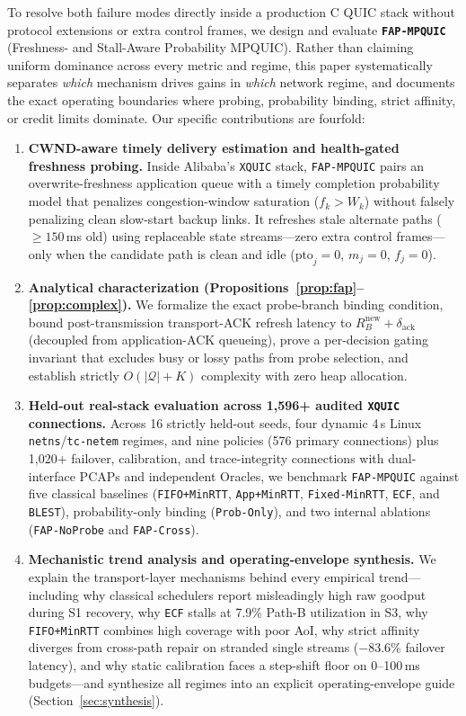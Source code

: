 \documentclass[preprint,12pt,number]{elsarticle}
\begin{document}
To resolve both failure modes directly inside a production C QUIC stack without protocol extensions or extra control frames, we design and evaluate \textbf{\texttt{FAP-MPQUIC}} (Freshness- and Stall-Aware Probability MPQUIC). Rather than claiming uniform dominance across every metric and regime, this paper systematically separates \emph{which} mechanism drives gains in \emph{which} network regime, and documents the exact operating boundaries where probing, probability binding, strict affinity, or credit limits dominate. Our specific contributions are fourfold:
\begin{enumerate}
    \item \textbf{CWND-aware timely delivery estimation and health-gated freshness probing.} Inside Alibaba's \texttt{XQUIC} stack, \texttt{FAP-MPQUIC} pairs an overwrite-freshness application queue with a timely completion probability model that penalizes congestion-window saturation ($f_k > W_k$) without falsely penalizing clean slow-start backup links. It refreshes stale alternate paths ($\ge 150$\,ms old) using replaceable state streams---zero extra control frames---only when the candidate path is clean and idle ($\text{pto}_j{=}0$, $m_j{=}0$, $f_j{=}0$).
    \item \textbf{Analytical characterization (Propositions~\ref{prop:fap}--\ref{prop:complex}).} We formalize the exact probe-branch binding condition, bound post-transmission transport-ACK refresh latency to $R_B^{\text{new}} + \delta_{\text{ack}}$ (decoupled from application-ACK queueing), prove a per-decision gating invariant that excludes busy or lossy paths from probe selection, and establish strictly $O(|\mathcal{Q}| + K)$ complexity with zero heap allocation.
    \item \textbf{Held-out real-stack evaluation across 1,596+ audited \texttt{XQUIC} connections.} Across 16 strictly held-out seeds, four dynamic 4\,s Linux \texttt{netns}/\texttt{tc-netem} regimes, and nine policies (576 primary connections) plus 1,020+ failover, calibration, and trace-integrity connections with dual-interface PCAPs and independent Oracles, we benchmark \texttt{FAP-MPQUIC} against five classical baselines (\texttt{FIFO+MinRTT}, \texttt{App+MinRTT}, \texttt{Fixed-MinRTT}, \texttt{ECF}, and \texttt{BLEST}), probability-only binding (\texttt{Prob-Only}), and two internal ablations (\texttt{FAP-NoProbe} and \texttt{FAP-Cross}).
    \item \textbf{Mechanistic trend analysis and operating-envelope synthesis.} We explain the transport-layer mechanisms behind every empirical trend---including why classical schedulers report misleadingly high raw goodput during S1 recovery, why \texttt{ECF} stalls at 7.9\% Path-B utilization in S3, why \texttt{FIFO+MinRTT} combines high coverage with poor AoI, why strict affinity diverges from cross-path repair on stranded single streams ($-$83.6\% failover latency), and why static calibration faces a step-shift floor on 0--100\,ms budgets---and synthesize all regimes into an explicit operating-envelope guide (Section~\ref{sec:synthesis}).
\end{enumerate}
\end{document}
